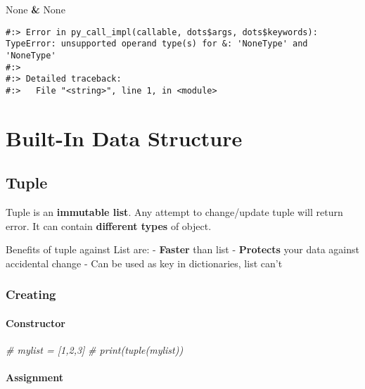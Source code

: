 \documentclass[
]{book}
\newenvironment{Shaded}{\begin{snugshade}}{\end{snugshade}}
\newcommand{\CommentTok}[1]{\textcolor[rgb]{0.37,0.37,0.37}{\textit{#1}}}
\newcommand{\OperatorTok}[1]{\textcolor[rgb]{0.43,0.43,0.43}{\textbf{#1}}}
\newcommand{\VariableTok}[1]{\textcolor[rgb]{0,0,0}{#1}}
\begin{document}
\begin{Shaded}
\begin{Highlighting}[]
\VariableTok{None} \OperatorTok{\&} \VariableTok{None}
\end{Highlighting}
\end{Shaded}

\begin{verbatim}
#:> Error in py_call_impl(callable, dots$args, dots$keywords): TypeError: unsupported operand type(s) for &: 'NoneType' and 'NoneType'
#:> 
#:> Detailed traceback: 
#:>   File "<string>", line 1, in <module>
\end{verbatim}

\hypertarget{built-in-data-structure}{%
\chapter{Built-In Data Structure}\label{built-in-data-structure}}

\hypertarget{tuple}{%
\section{Tuple}\label{tuple}}

Tuple is an \textbf{immutable list}. Any attempt to change/update tuple will return error. It can contain \textbf{different types} of object.

Benefits of tuple against List are: - \textbf{Faster} than list - \textbf{Protects} your data against accidental change - Can be used as key in dictionaries, list can't

\hypertarget{creating}{%
\subsection{Creating}\label{creating}}

\hypertarget{constructor-1}{%
\subsubsection{Constructor}\label{constructor-1}}

\begin{Shaded}
\begin{Highlighting}[]
\CommentTok{\# mylist = [1,2,3]}
\CommentTok{\# print(tuple(mylist))}
\end{Highlighting}
\end{Shaded}

\hypertarget{assignment-1}{%
\subsubsection{Assignment}\label{assignment-1}}
\end{document}
